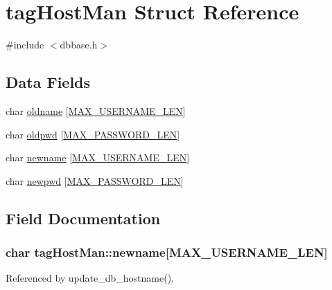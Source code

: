 \hypertarget{structtagHostMan}{\section{tag\-Host\-Man Struct Reference}
\label{structtagHostMan}
}


{\ttfamily \#include $<$dbbase.\-h$>$}

\subsection*{Data Fields}
\begin{DoxyCompactItemize}
\item 
char \hyperlink{structtagHostMan_a3413a7557e35439e2db48b7306fef73e}{oldname} \mbox{[}\hyperlink{dbbase_8h_a6c4647395896246d6710ba980c31666c}{M\-A\-X\-\_\-\-U\-S\-E\-R\-N\-A\-M\-E\-\_\-\-L\-E\-N}\mbox{]}
\item 
char \hyperlink{structtagHostMan_accd78689880268e9606e6f74f8edfdfc}{oldpwd} \mbox{[}\hyperlink{dbbase_8h_ae9169c3fda2dfecbb7a13e394a69e5be}{M\-A\-X\-\_\-\-P\-A\-S\-S\-W\-O\-R\-D\-\_\-\-L\-E\-N}\mbox{]}
\item 
char \hyperlink{structtagHostMan_af651492896bb6d255259c53943efa428}{newname} \mbox{[}\hyperlink{dbbase_8h_a6c4647395896246d6710ba980c31666c}{M\-A\-X\-\_\-\-U\-S\-E\-R\-N\-A\-M\-E\-\_\-\-L\-E\-N}\mbox{]}
\item 
char \hyperlink{structtagHostMan_a9fabe735adf7ccc88052c4b370f45b57}{newpwd} \mbox{[}\hyperlink{dbbase_8h_ae9169c3fda2dfecbb7a13e394a69e5be}{M\-A\-X\-\_\-\-P\-A\-S\-S\-W\-O\-R\-D\-\_\-\-L\-E\-N}\mbox{]}
\end{DoxyCompactItemize}


\subsection{Field Documentation}
\hypertarget{structtagHostMan_af651492896bb6d255259c53943efa428}{
\subsubsection[{newname}]{\setlength{\rightskip}{0pt plus 5cm}char tag\-Host\-Man\-::newname\mbox{[}{\bf M\-A\-X\-\_\-\-U\-S\-E\-R\-N\-A\-M\-E\-\_\-\-L\-E\-N}\mbox{]}}}\label{structtagHostMan_af651492896bb6d255259c53943efa428}


Referenced by update\-\_\-db\-\_\-hostname().

